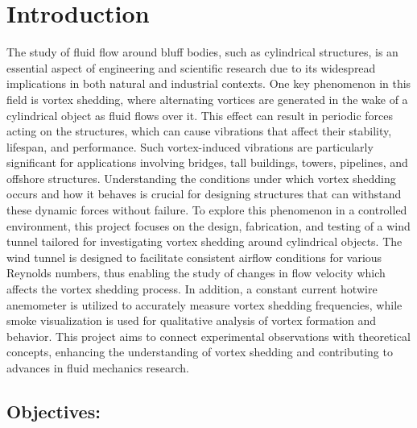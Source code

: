 \chapter{Introduction}\label{ch:introduction}
The study of fluid flow around bluff bodies, such as cylindrical structures, is an essential aspect of engineering and scientific research due to its widespread implications in both natural and industrial contexts. One key phenomenon in this field is vortex shedding, where alternating vortices are generated in the wake of a cylindrical object as fluid flows over it. This effect can result in periodic forces acting on the structures, which can cause vibrations that affect their stability, lifespan, and performance. Such vortex-induced vibrations are particularly significant for applications involving bridges, tall buildings, towers, pipelines, and offshore structures. Understanding the conditions under which vortex shedding occurs and how it behaves is crucial for designing structures that can withstand these dynamic forces without failure.
To explore this phenomenon in a controlled environment, this project focuses on the design, fabrication, and testing of a wind tunnel tailored for investigating vortex shedding around cylindrical objects. The wind tunnel is designed to facilitate consistent airflow conditions for various Reynolds numbers, thus enabling the study of changes in flow velocity which affects the vortex shedding process. In addition, a constant current hotwire anemometer is utilized to accurately measure vortex shedding frequencies, while smoke visualization is used for qualitative analysis of vortex formation and behavior. This project aims to connect experimental observations with theoretical concepts, enhancing the understanding of vortex shedding and contributing to advances in fluid mechanics research.


\section{Objectives:}

